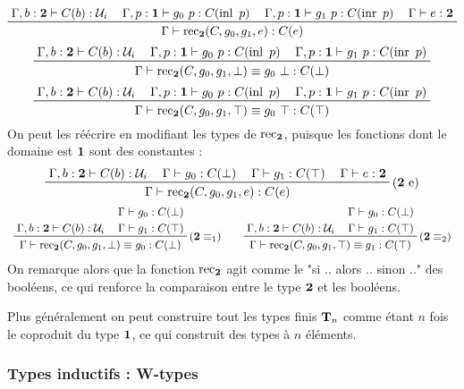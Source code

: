\documentclass[../../rapport.tex]{subfiles}
\begin{document}
\begin{example}[Le type $\2$]
    $$
    \prfinterspace=1.2em
    \prftree
      {\Gamma, b : \2 \vdash C(b) :\U_i}
      {\Gamma, p : \1 \vdash g_0\ p : C(\inl\ p)}
      {\Gamma, p : \1 \vdash g_1\ p : C(\inr\ p)}
      {\Gamma \vdash e : \2}
      {\Gamma \vdash \rec_{\2}(C, g_0, g_1, e) : C(e)}
    $$
    $$
    \prfinterspace=1.2em
    \prftree
      {\Gamma, b: \2 \vdash C(b) : \U_i}
      {\Gamma, p : \1 \vdash g_0\ p : C(\inl\ p)}
      {\Gamma, p : \1 \vdash g_1\ p : C(\inr\ p)}
    {\Gamma \vdash \rec_{\2}(C, g_0, g_1, \bot) \equiv g_0\ \bot : C(\bot)}
    $$
    $$
    \prfinterspace=1.2em
    \prftree
      {\Gamma, b: \2 \vdash C(b) : \U_i}
      {\Gamma, p : \1 \vdash g_0\ p : C(\inl\ p)}
      {\Gamma, p : \1 \vdash g_1\ p : C(\inr\ p)}
    {\Gamma \vdash \rec_{\2}(C, g_0, g_1, \top) \equiv g_0\ \top : C(\top)}
    $$
    On peut les réécrire en modifiant les types de $\operatorname{rec}_{\operatorname{\textbf{2}}}$, puisque les fonctions dont le domaine est $\operatorname{\textbf{1}}$ sont des constantes :
    $$
    \prfinterspace=1.2em
    \prftree[r]{($\2$ e)}
      {\Gamma, b : \2 \vdash C(b) :\U_i}
      {\Gamma \vdash g_0: C(\bot)}
      {\Gamma \vdash g_1 : C(\top)}
      {\Gamma \vdash e : \2}
      {\Gamma \vdash \rec_{\2}(C, g_0, g_1, e) : C(e)}
    $$
    $$\begin{array}{cc}
      \prfinterspace=1.2em
      \prftree[r]{($\2 \equiv_1$)}
	{\Gamma, b : \2 \vdash C(b) : \U_i}
	{\prfStackPremises{\Gamma \vdash g_0 : C(\bot)}
	{\Gamma \vdash g_1 : C(\top)}}
      {\Gamma \vdash \rec_{\2}(C, g_0, g_1, \bot) \equiv g_0 : C(\bot)} \hspace{1em}
      &
      \prfinterspace=1.2em
      \prftree[r]{($\2 \equiv_2$)}
	{\Gamma, b : \2 \vdash C(b) : \U_i}
	{\prfStackPremises{\Gamma \vdash g_0 : C(\bot)}
	{\Gamma \vdash g_1 : C(\top)}}
      {\Gamma \vdash \rec_{\2}(C, g_0, g_1, \top) \equiv g_1 : C(\top)}
    \end{array}$$
    On remarque alors que la fonction $\operatorname{rec}_{\operatorname{\textbf{2}}}$ agit comme le "si .. alors .. sinon .." des booléens,
    ce qui renforce la comparaison entre le type $\2$ et les booléens.
  \end{example}

  Plus généralement on peut construire tout les types finis $\mathbf T_n$ comme étant $n$ fois le coproduit du type $\operatorname{\textbf{1}}$,
  ce qui construit des types à $n$ éléments.

  \subsubsection{Types inductifs : W-types}
\end{document}
